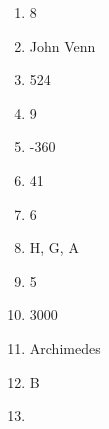 \documentclass[../uilmath.tex]{subfiles}
\begin{document}
\begin{enumerate}[label=\bfseries\arabic*.]
    \item %
    8

    \item %
    John Venn 

    \item %
    524

    \item %
    9

    \item %
    -360

    \item %
    41

    \item %
    6

    \item %
    H, G, A 

    \item %
    5

    \item %
    3000

    \item %
    Archimedes

    \item %
    B 

    \item %
    
\end{enumerate}
\end{document}
